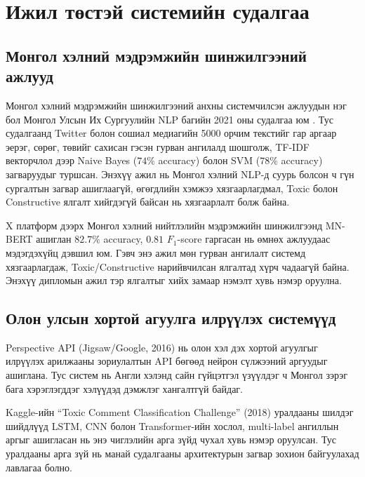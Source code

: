 
\section{Ижил төстэй системийн судалгаа}

\subsection{Монгол хэлний мэдрэмжийн шинжилгээний ажлууд}

Монгол хэлний мэдрэмжийн шинжилгээний анхны системчилсэн ажлуудын нэг бол
Монгол Улсын Их Сургуулийн NLP багийн 2021 оны судалгаа юм \cite{mnunlp2021}.
Тус судалгаанд Twitter болон сошиал медиагийн 5000 орчим текстийг гар аргаар
эерэг, сөрөг, төвийг сахисан гэсэн гурван ангилалд шошголж, TF-IDF векторчлол
дээр Naive Bayes ($74\%$ accuracy) болон SVM ($78\%$ accuracy) загваруудыг
туршсан. Энэхүү ажил нь Монгол хэлний NLP-д суурь болсон ч гүн сургалтын
загвар ашиглаагүй, өгөгдлийн хэмжээ хязгаарлагдмал, Toxic болон Constructive
ялгалт хийгдэгүй байсан нь хязгаарлалт болж байна.

\cite{jargalmaa2025} X платформ дээрх Монгол хэлний нийтлэлийн мэдрэмжийн
шинжилгээнд MN-BERT ашиглан $82.7\%$ accuracy, $0.81$ $F_1$-score гаргасан нь
өмнөх ажлуудаас мэдэгдэхүйц дэвшил юм. Гэвч энэ ажил мөн гурван ангилалт
системд хязгаарлагдаж, Toxic/Constructive нарийвчилсан ялгалтад хүрч чадаагүй
байна. Энэхүү дипломын ажил тэр ялгалтыг хийх замаар нэмэлт хувь нэмэр оруулна.

\subsection{Олон улсын хортой агуулга илрүүлэх системүүд}

Perspective API (Jigsaw/Google, 2016) нь олон хэл дэх хортой агуулгыг илрүүлэх
арилжааны зориулалтын API бөгөөд нейрон сүлжээний аргуудыг ашиглана. Тус систем
нь Англи хэлэнд сайн гүйцэтгэл үзүүлдэг ч Монгол зэрэг бага хэрэглэгддэг
хэлүүдэд дэмжлэг хангалтгүй байдаг.

Kaggle-ийн ``Toxic Comment Classification Challenge'' (2018) уралдааны шилдэг
шийдлүүд LSTM, CNN болон Transformer-ийн хослол, multi-label ангиллын аргыг
ашигласан нь энэ чиглэлийн арга зүйд чухал хувь нэмэр оруулсан. Тус уралдааны
арга зүй нь манай судалгааны архитектурын загвар зохион байгуулахад лавлагаа
болно.

